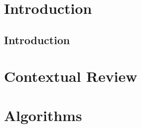 
\part*{Introduction}\label{part:intro}
    \chapter{Introduction}\label{chapter:intro}
        

\part{Contextual Review}\label{part:contextual_review}

\part{Algorithms}\label{part:algorithms}
%         
%         
%         

